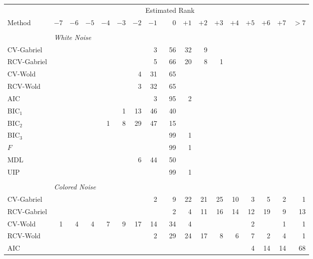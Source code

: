 \begin{table}
    \tiny
    \centering    
    \begin{tabular}{lrrrrrrrrrrrrrrrr}
        \toprule
        &\multicolumn{15}{c}{\scriptsize{Estimated Rank}} \\
        \cmidrule{2-17}
        \scriptsize{Method}
            & $-7$ & $-6$ & $-5$ & $-4$ & $-3$ & $-2$ & $-1$ 
            & $\phantom{+}0$ 
            & $+1$ & $+2$ & $+3$ & $+4$ & $+5$ & $+6$ & $+7$ & $> 7$ \\
        \midrule
        \\
        &\multicolumn{16}{l}{\scriptsize{\textit{White Noise}}} \\
 CV-Gabriel &  &  &  &  &  &  &  3 &  56 &  32 &  9 &  &  &  &  &  & \\ 
 RCV-Gabriel &  &  &  &  &  &  &  5 &  66 &  20 &  8 &  1 &  &  &  &  & \\ 
 CV-Wold &  &  &  &  &  &  4 &  31 &  65 &  &  &  &  &  &  &  & \\ 
 RCV-Wold &  &  &  &  &  &  3 &  32 &  65 &  &  &  &  &  &  &  & \\ 
 AIC &  &  &  &  &  &  &  3 &  95 &  2 &  &  &  &  &  &  & \\ 
 BIC$_1$ &  &  &  &  &  1 &  13 &  46 &  40 &  &  &  &  &  &  &  & \\ 
 BIC$_2$ &  &  &  &  1 &  8 &  29 &  47 &  15 &  &  &  &  &  &  &  & \\ 
 BIC$_3$ &  &  &  &  &  &  &  &  99 &  1 &  &  &  &  &  &  & \\ 
 $F$ &  &  &  &  &  &  &  &  99 &  1 &  &  &  &  &  &  & \\ 
 MDL &  &  &  &  &  &  6 &  44 &  50 &  &  &  &  &  &  &  & \\ 
 UIP &  &  &  &  &  &  &  &  99 &  1 &  &  &  &  &  &  & \\ 
         \\
        &\multicolumn{16}{l}{\scriptsize{\textit{Colored Noise}}} \\
CV-Gabriel &  &  &  &  &  &  &  2 &  9 &  22 &  21 &  25 &  10 &  3 &  5 &  2 &  1\\ 
 RCV-Gabriel &  &  &  &  &  &  &  &  2 &  4 &  11 &  16 &  14 &  12 &  19 &  9 &  13\\ 
 CV-Wold &  1 &  4 &  4 &  7 &  9 &  17 &  14 &  34 &  4 &  &  &  &  2 &  &  1 &  1\\ 
 RCV-Wold &  &  &  &  &  &  &  2 &  29 &  24 &  17 &  8 &  6 &  7 &  2 &  4 &  1\\ 
 AIC &  &  &  &  &  &  &  &  &  &  &  &  &  4 &  14 &  14 &  68\\ 

\end{tabular}
\end{table}
